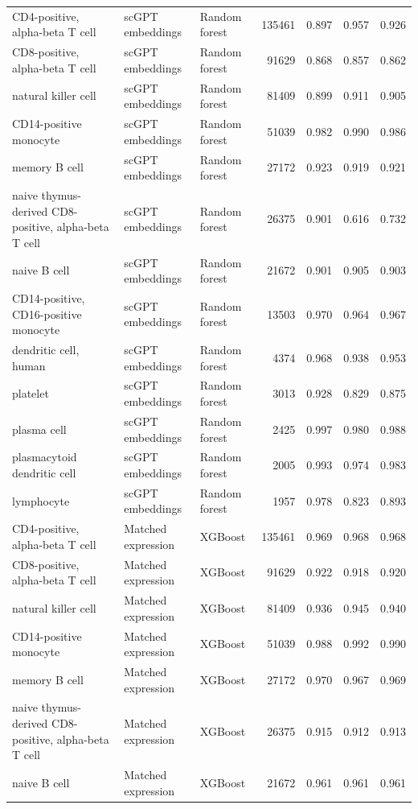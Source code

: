 {\begin{longtable}{>{\raggedright\arraybackslash}p{4.2cm}llrrrr}
CD4-positive, alpha-beta T cell & scGPT embeddings & Random forest & 135461 & 0.897 & 0.957 & 0.926 \\
CD8-positive, alpha-beta T cell & scGPT embeddings & Random forest & 91629 & 0.868 & 0.857 & 0.862 \\
natural killer cell & scGPT embeddings & Random forest & 81409 & 0.899 & 0.911 & 0.905 \\
CD14-positive monocyte & scGPT embeddings & Random forest & 51039 & 0.982 & 0.990 & 0.986 \\
memory B cell & scGPT embeddings & Random forest & 27172 & 0.923 & 0.919 & 0.921 \\
naive thymus-derived CD8-positive, alpha-beta T cell & scGPT embeddings & Random forest & 26375 & 0.901 & 0.616 & 0.732 \\
naive B cell & scGPT embeddings & Random forest & 21672 & 0.901 & 0.905 & 0.903 \\
CD14-positive, CD16-positive monocyte & scGPT embeddings & Random forest & 13503 & 0.970 & 0.964 & 0.967 \\
dendritic cell, human & scGPT embeddings & Random forest & 4374 & 0.968 & 0.938 & 0.953 \\
platelet & scGPT embeddings & Random forest & 3013 & 0.928 & 0.829 & 0.875 \\
plasma cell & scGPT embeddings & Random forest & 2425 & 0.997 & 0.980 & 0.988 \\
plasmacytoid dendritic cell & scGPT embeddings & Random forest & 2005 & 0.993 & 0.974 & 0.983 \\
lymphocyte & scGPT embeddings & Random forest & 1957 & 0.978 & 0.823 & 0.893 \\
CD4-positive, alpha-beta T cell & Matched expression & XGBoost & 135461 & 0.969 & 0.968 & 0.968 \\
CD8-positive, alpha-beta T cell & Matched expression & XGBoost & 91629 & 0.922 & 0.918 & 0.920 \\
natural killer cell & Matched expression & XGBoost & 81409 & 0.936 & 0.945 & 0.940 \\
CD14-positive monocyte & Matched expression & XGBoost & 51039 & 0.988 & 0.992 & 0.990 \\
memory B cell & Matched expression & XGBoost & 27172 & 0.970 & 0.967 & 0.969 \\
naive thymus-derived CD8-positive, alpha-beta T cell & Matched expression & XGBoost & 26375 & 0.915 & 0.912 & 0.913 \\
naive B cell & Matched expression & XGBoost & 21672 & 0.961 & 0.961 & 0.961 \\

\end{longtable}}
